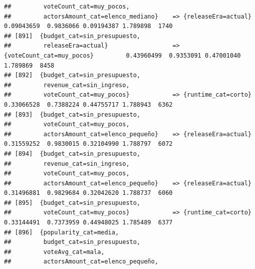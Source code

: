 \documentclass[
]{article}
\begin{document}
\begin{verbatim}
##         voteCount_cat=muy_pocos,                                                                                                
##         actorsAmount_cat=elenco_mediano}    => {releaseEra=actual}               0.09043659  0.9836066 0.09194387 1.789898  1740
## [891]  {budget_cat=sin_presupuesto,                                                                                             
##         releaseEra=actual}                  => {voteCount_cat=muy_pocos}         0.43960499  0.9353091 0.47001040 1.789869  8458
## [892]  {budget_cat=sin_presupuesto,                                                                                             
##         revenue_cat=sin_ingreso,                                                                                                
##         voteCount_cat=muy_pocos}            => {runtime_cat=corto}               0.33066528  0.7388224 0.44755717 1.788943  6362
## [893]  {budget_cat=sin_presupuesto,                                                                                             
##         voteCount_cat=muy_pocos,                                                                                                
##         actorsAmount_cat=elenco_pequeño}    => {releaseEra=actual}               0.31559252  0.9830015 0.32104990 1.788797  6072
## [894]  {budget_cat=sin_presupuesto,                                                                                             
##         revenue_cat=sin_ingreso,                                                                                                
##         voteCount_cat=muy_pocos,                                                                                                
##         actorsAmount_cat=elenco_pequeño}    => {releaseEra=actual}               0.31496881  0.9829684 0.32042620 1.788737  6060
## [895]  {budget_cat=sin_presupuesto,                                                                                             
##         voteCount_cat=muy_pocos}            => {runtime_cat=corto}               0.33144491  0.7373959 0.44948025 1.785489  6377
## [896]  {popularity_cat=media,                                                                                                   
##         budget_cat=sin_presupuesto,                                                                                             
##         voteAvg_cat=mala,                                                                                                       
##         actorsAmount_cat=elenco_pequeño,                                                                                        

\end{verbatim}
\end{document}
